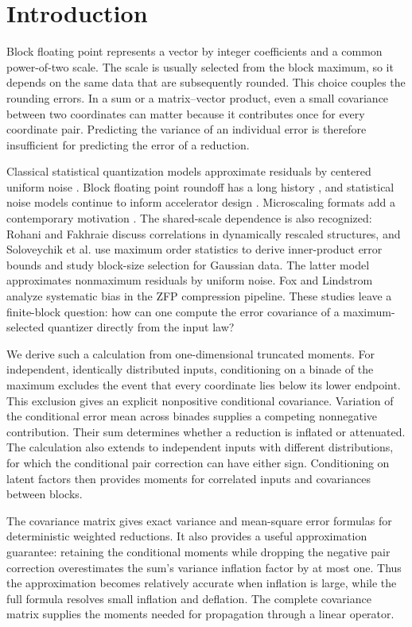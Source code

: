 \section{Introduction}\label{sec:intro}
Block floating point represents a vector by integer coefficients and a common
power-of-two scale. The scale is usually selected from the block maximum,
so it depends on the same data that are subsequently rounded. This choice
couples the rounding errors. In a sum or a matrix--vector product, even a
small covariance between two coordinates can matter because it contributes
once for every coordinate pair. Predicting the variance of an individual
error is therefore insufficient for predicting the error of a reduction.

Classical statistical quantization models approximate residuals by centered
uniform noise \cite{widrow1996,widrow2008}. Block floating point roundoff
has a long history \cite{kalliojarvi1996}, and statistical noise models
continue to inform accelerator design \cite{song2018,lian2019}.
Microscaling formats add a contemporary motivation \cite{ocpmx2023}.
The shared-scale dependence is also
recognized: Rohani and Fakhraie \cite{rohani2006} discuss correlations in
dynamically rescaled structures, and Soloveychik et al.
\cite{soloveychik2022} use maximum order statistics to derive inner-product
error bounds and study block-size selection for Gaussian data. The latter
model approximates nonmaximum residuals by uniform noise. Fox and Lindstrom
\cite{fox2026zfp} analyze systematic bias in the ZFP compression pipeline.
These studies leave a finite-block question: how can one compute the error
covariance of a maximum-selected quantizer directly from the input law?

We derive such a calculation from one-dimensional truncated moments.
For independent, identically distributed inputs, conditioning on a binade
of the maximum excludes the event that every coordinate lies below its
lower endpoint. This exclusion gives an explicit nonpositive conditional
covariance. Variation of the conditional error mean across binades supplies
a competing nonnegative contribution. Their sum determines whether a
reduction is inflated or attenuated. The calculation also extends to
independent inputs with different distributions, for which the conditional
pair correction can have either sign. Conditioning on latent factors then
provides moments for correlated inputs and covariances between blocks.

The covariance matrix gives exact variance and mean-square error formulas
for deterministic weighted reductions. It also provides a useful
approximation guarantee: retaining the conditional moments while dropping
the negative pair correction overestimates the sum's variance inflation
factor by at most one. Thus the approximation becomes relatively accurate
when inflation is large, while the full formula resolves small inflation
and deflation. The complete covariance matrix supplies the moments needed
for propagation through a linear operator.

